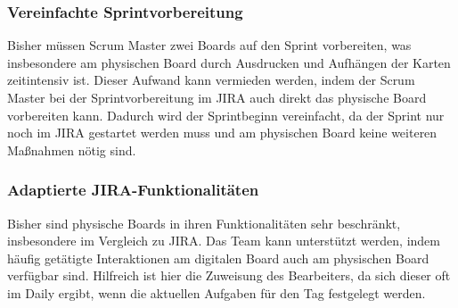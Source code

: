 \documentclass[12pt,titlepage]{scrartcl}
\begin{document}
		\subsubsection{Vereinfachte Sprintvorbereitung}
		Bisher müssen Scrum Master zwei Boards auf den Sprint vorbereiten, was insbesondere am physischen Board durch Ausdrucken und Aufhängen der Karten zeitintensiv ist. Dieser Aufwand kann vermieden werden, indem der Scrum Master bei der Sprintvorbereitung im JIRA auch direkt das physische Board vorbereiten kann. Dadurch wird der Sprintbeginn vereinfacht, da der Sprint nur noch im JIRA gestartet werden muss und am physischen Board keine weiteren Maßnahmen nötig sind.
		\subsubsection{Adaptierte JIRA-Funktionalitäten}
		Bisher sind physische Boards in ihren Funktionalitäten sehr beschränkt, insbesondere im Vergleich zu JIRA. Das Team kann unterstützt werden, indem häufig getätigte Interaktionen am digitalen Board auch am physischen Board verfügbar sind. Hilfreich ist hier die Zuweisung des Bearbeiters, da sich dieser oft im Daily ergibt, wenn die aktuellen Aufgaben für den Tag festgelegt werden. 
	\newpage
\end{document}
